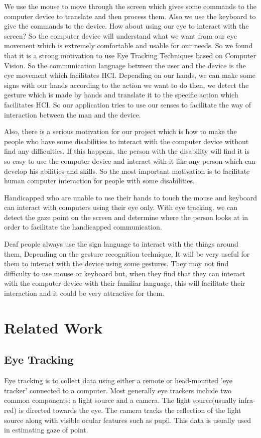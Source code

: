 We use the mouse to move through the screen which gives some commands to the computer device to translate and then process them. Also we use the keyboard to give the commands to the device. How about using our eye to interact with the screen? So the computer device will understand what we want from our eye movement which is extremely comfortable and usable for our needs. So we found that it is a strong motivation to use Eye Tracking Techniques based on Computer Vision. So the communication language between the user and the device is the eye movement which facilitates HCI. Depending on our hands, we can make some signs with our hands according to the action we want to do then, we detect the gesture which is made by hands and translate it to the specific action which facilitates HCI. So our application tries to use our senses to facilitate the way of interaction between the man and the device. \bigskip

Also, there is a serious motivation for our project which is how to make the people who have some disabilities to interact with the computer device without find any difficulties. If this happens, the person with the disability will find it is so easy to use the computer device and interact with it like any person which can develop his abilities and skills. So the most important motivation is to facilitate human computer interaction for people with some disabilities. \bigskip

Handicapped who are unable to use their hands to touch the mouse and keyboard can interact with computers using their eye only. With eye tracking, we can detect the gaze point on the screen and determine where the person looks at in order to facilitate the handicapped communication. \bigskip

Deaf people always use the sign language to interact with  the things around them, Depending on the gesture recognition technique, It will be very useful for them to interact with the device using some gestures. They may not find difficulty to use mouse or keyboard but, when they find that they can interact with the computer device with their familiar language, this will facilitate their interaction and it could be very attractive for them.

\section{Related Work}
\subsection{Eye Tracking} 
Eye tracking is to collect data using either a remote or head-mounted 'eye tracker' connected to a computer. Most generally eye trackers include two common components: a light source and a camera. The light source(usually infra-red) is directed towards the eye. The camera tracks the reflection of the light source along with visible ocular features such as pupil. This data is usually used in estimating gaze of point. \bigskip

